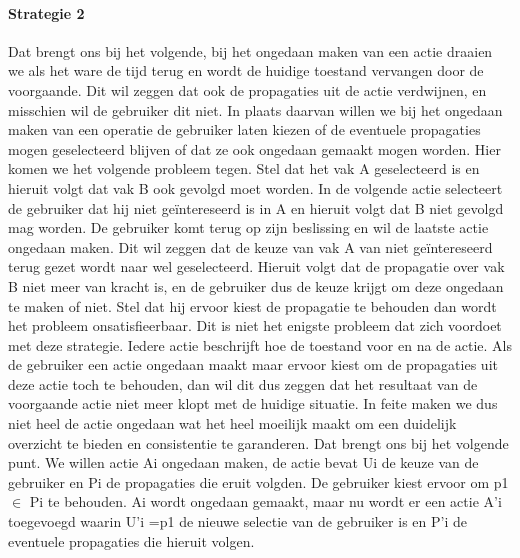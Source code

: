 \paragraph{Strategie 2}
Dat brengt ons bij het volgende, bij het ongedaan maken van een actie draaien we als het ware de tijd terug en wordt de huidige toestand vervangen door de voorgaande. Dit wil zeggen dat ook de propagaties uit de actie verdwijnen, en misschien wil de gebruiker dit niet. In plaats daarvan willen we bij het ongedaan maken van een operatie de gebruiker laten kiezen of de eventuele propagaties mogen geselecteerd blijven of dat ze ook ongedaan gemaakt mogen worden. Hier komen we het volgende probleem tegen. Stel dat het vak A geselecteerd is en hieruit volgt dat vak B ook gevolgd moet worden. In de volgende actie selecteert de gebruiker dat hij niet ge\"{i}ntereseerd is in A en hieruit volgt dat B niet gevolgd mag worden. De gebruiker komt terug op zijn beslissing en wil de laatste actie ongedaan maken. Dit wil zeggen dat de keuze van vak A van niet ge\"{i}ntereseerd terug gezet wordt naar wel geselecteerd. Hieruit volgt dat de propagatie over vak B niet meer van kracht is, en de gebruiker dus de keuze krijgt om deze ongedaan te maken of niet. Stel dat hij ervoor kiest de propagatie te behouden dan wordt het probleem onsatisfieerbaar. Dit is niet het enigste probleem dat zich voordoet met deze strategie. Iedere actie beschrijft hoe de toestand voor en na de actie. Als de gebruiker een actie ongedaan maakt maar ervoor kiest om de propagaties uit deze actie toch te behouden, dan wil dit dus zeggen dat het resultaat van de voorgaande actie niet meer klopt met de huidige situatie. In feite maken we dus niet heel de actie ongedaan wat het heel moeilijk maakt om een duidelijk overzicht te bieden en consistentie te garanderen. Dat brengt ons bij het volgende punt. We willen actie Ai ongedaan maken, de actie bevat Ui de keuze van de gebruiker en Pi de propagaties die eruit volgden. De gebruiker kiest ervoor om p1 $\in$ Pi te behouden. Ai wordt ongedaan gemaakt, maar nu wordt er een actie A'i toegevoegd waarin U'i ={p1} de nieuwe selectie van de gebruiker is en P'i de eventuele propagaties die hieruit volgen. 


